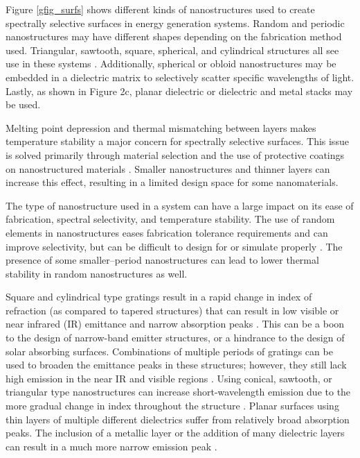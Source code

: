 \documentclass[10pt,letterpaper]{article}
\begin{document}
Figure \ref{gfig_surfs} shows different kinds of nanostructures used to create spectrally selective surfaces in energy generation systems.  Random and periodic nanostructures may have different shapes depending on the fabrication method used.  Triangular, sawtooth, square, spherical, and cylindrical structures all see use in these systems \cite{global_opt,paper2_ref6,RF_OptExp_2009}.  Additionally, spherical or obloid nanostructures may be embedded in a dielectric matrix to selectively scatter specific wavelengths of light.  Lastly, as shown in Figure 2c, planar dielectric or dielectric and metal stacks may be used.

Melting point depression and thermal mismatching between layers makes temperature stability a major concern for spectrally selective surfaces.  This issue is solved primarily through material selection and the use of protective coatings on nanostructured materials \cite{paper1_ref5}.  Smaller nanostructures and thinner layers can increase this effect, resulting in a limited design space for some nanomaterials.

The type of nanostructure used in a system can have a large impact on its ease of fabrication, spectral selectivity, and temperature stability.  The use of random elements in nanostructures eases fabrication tolerance requirements and can improve selectivity, but can be difficult to design for or simulate properly \cite{me1}.  The presence of some smaller--period nanostructures can lead to lower thermal stability in random nanostructures as well. 

Square and cylindrical type gratings result in a rapid change in index of refraction (as compared to tapered structures) that can result in low visible or near infrared (IR) emittance and narrow absorption peaks \cite{paper1_ref6,paper2_ref13}.  This can be a boon to the design of narrow-band emitter structures, or a hindrance to the design of solar absorbing surfaces.  Combinations of multiple periods of gratings can be used to broaden the emittance peaks in these structures; however, they still lack high emission in the near IR and visible regions \cite{paper2_ref14}.  Using conical, sawtooth, or triangular type nanostructures can increase short-wavelength emission due to the more gradual change in index throughout the structure \cite{Grann_JOSA,me2}.
Planar surfaces using thin layers of multiple different dielectrics suffer from relatively broad absorption peaks.  The inclusion of a metallic layer or the addition of many dielectric layers can result in a much more narrow emission peak \cite{RF_OptExp_2009}.  
\end{document}
